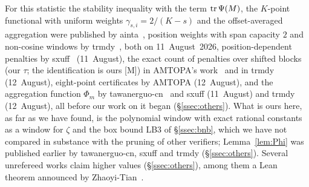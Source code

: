 \begin{remark}[Credit]\label{rem:credit}
For this statistic the stability inequality with the term $\operatorname{tr}\Psi(M)$, the $K$-point functional with uniform weights $\gamma_{s,i}=2/(K-s)$
and the offset-averaged
aggregation were published by \mbox{ainta}~\cite{ainta}, position weights with span capacity $2$ and non-cosine windows by
\mbox{trmdy}~\cite{trmdy}, both on 11~August~2026, position-dependent penalties by \mbox{sxuff}~\cite{sxuff} (11~August), the exact count of penalties
over shifted blocks (our $\tau$; the identification is ours [M]) in \mbox{AMTOPA}'s work~\cite{AMTOPA} and in \mbox{trmdy} (12~August), eight-point
certificates by \mbox{AMTOPA} (12~August), and the aggregation function $\Phi_m$ by tawanerguo-cn~\cite{TawanRepo} and \mbox{sxuff} (11~August) and \mbox{trmdy}
(12~August), all before our work on it began (\S\ref{ssec:others}). What is ours here, as far as we have found, is the polynomial window with
exact rational constants as a window for $\zeta$ and the box bound LB3 of \S\ref{ssec:bnb}, which we have not compared in substance with the
pruning of other verifiers; Lemma~\ref{lem:Phi} was
published earlier by tawanerguo-cn, \mbox{sxuff} and \mbox{trmdy} (\S\ref{ssec:others}). Several unrefereed works claim higher values
(\S\ref{ssec:others}), among them a Lean theorem announced by Zhaoyi-Tian~\cite{ZhaoyiTian}.
\end{remark}
